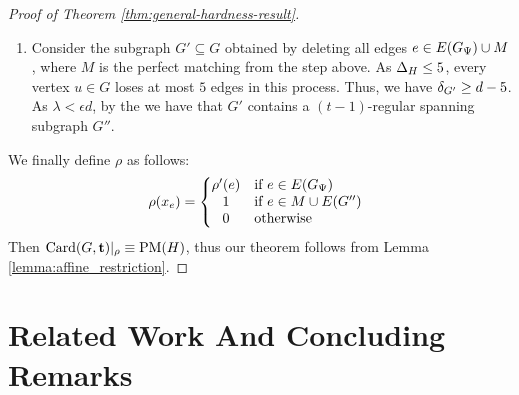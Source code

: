 \documentclass[11pt]{article}
\providecommand{\DIFaddbegin}{} %
\providecommand{\DIFaddend}{} %
\providecommand{\DIFdelbegin}{} %
\providecommand{\DIFdelend}{} %
\begin{document}
\begin{proof}[Proof of Theorem \ref{thm:general-hardness-result}]
\begin{enumerate}
\DIFdelbegin %
\DIFdelend \DIFaddbegin \item{
  Consider the subgraph $G' \subseteq G$ obtained by deleting all edges $e \in E(G_{\Psi}) \cup M$, where $M$ is the perfect matching from the step above. As $\Delta_{H} \leq 5$, every vertex $u \in G$ loses at most $5$ edges in this process. Thus, we have $\delta_{G'} \ge d - 5$. As $\lambda < \epsilon d$, by the  we have that $G'$ contains a $(t-1)$-regular spanning subgraph $G''$. }
\DIFaddend 

\end{enumerate}

We finally define $\rho$ as follows:
\[
\rho(x_e) =
\left\{
\begin{array}{@{}cl}
\rho'(e) & \text{if } e \in \Edges{G_{\EmbeddingFunc}} \\
1 & \text{if } e \in M \cup E(G'') \\
0 & \text{otherwise}
\end{array}
\right.
\]
Then $\text{Card}(G, \mathbf{t})|_\rho \equiv \text{PM}(H)$, thus our theorem follows from Lemma \ref{lemma:affine_restriction}.
\end{proof}


\section{Related Work And Concluding Remarks}
\label{sec:related-work}
\end{document}
